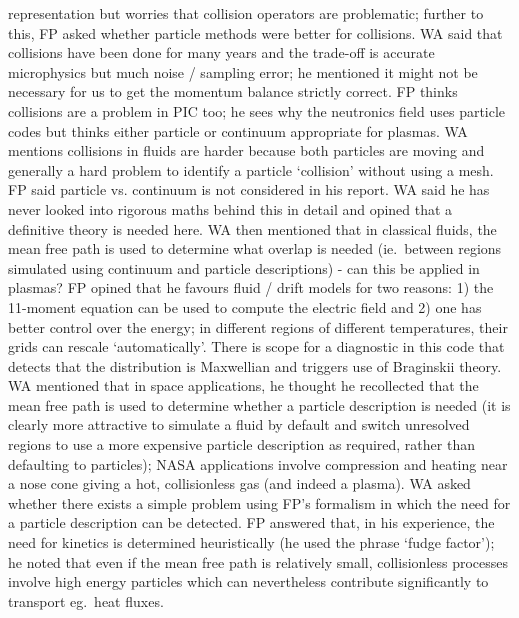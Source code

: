 representation but worries that collision operators are problematic; further to 
this, FP asked whether particle methods were better for collisions. WA said 
that collisions have been done for many years and the trade-off is accurate 
microphysics but much noise / sampling error; he mentioned it might not be 
necessary for us to get the momentum balance strictly correct.  FP thinks 
collisions are a problem in PIC too; he sees why the neutronics field uses 
particle codes but thinks either particle or continuum appropriate for plasmas. 
WA mentions collisions in fluids are harder because both particles are moving and generally 
a hard problem to identify a particle `collision' without using a mesh.
FP said particle vs. continuum is not considered in his 
report.  WA said he has never looked into rigorous maths behind this in detail 
and opined that a definitive theory is needed here.  WA then mentioned that in 
classical fluids, the mean free path is used to determine what overlap is 
needed (ie.\ between regions simulated using continuum and particle 
descriptions) - can this be applied in plasmas?  FP opined that he favours 
fluid / drift models for two reasons: 1) the 11-moment equation can be used to 
compute the electric field and 2) one has better control over the energy; in 
different regions of different temperatures, their grids can rescale 
`automatically'.  There is scope for a diagnostic in this code that detects 
that the distribution is Maxwellian and triggers use of Braginskii theory.  WA 
mentioned that in space applications, he thought he recollected that the
mean free path is used to determine 
whether a particle description is needed (it is clearly more attractive to 
simulate a fluid by default and switch unresolved regions to use a more 
expensive particle description as required, rather than defaulting to 
particles); NASA applications involve compression and heating near a nose cone 
giving a hot, collisionless gas (and indeed a plasma).  WA asked whether there 
exists a simple problem using FP's formalism in which the need for a particle 
description can be detected.  FP answered that, in his experience, the need for 
kinetics is determined heuristically (he used the phrase `fudge factor'); he 
noted that even if the mean free path is relatively small, collisionless 
processes involve high energy particles which can nevertheless contribute
significantly to transport eg.\ heat fluxes.

